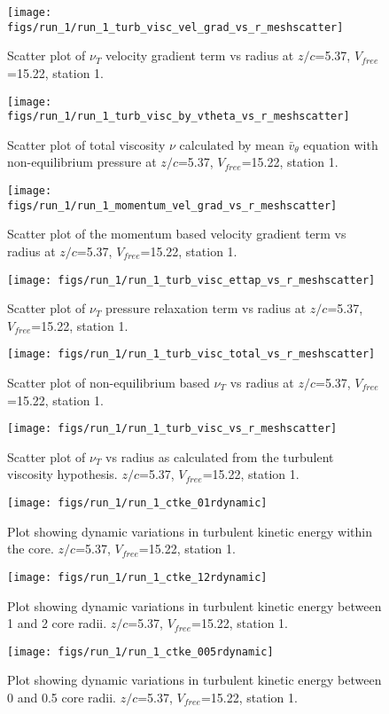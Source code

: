 \begin{figure}[H]
\centering
\texttt{[image: figs/run\_1/run\_1\_turb\_visc\_vel\_grad\_vs\_r\_meshscatter]}
\caption{Scatter plot of $\nu_T$ velocity gradient term vs radius at $z/c$=5.37, $V_{free}$=15.22, station 1.}
\end{figure}


\begin{figure}[H]
\centering
\texttt{[image: figs/run\_1/run\_1\_turb\_visc\_by\_vtheta\_vs\_r\_meshscatter]}
\caption{Scatter plot of total viscosity $\nu$ calculated by mean $\bar{v}_{\theta}$ equation with non-equilibrium pressure at $z/c$=5.37, $V_{free}$=15.22, station 1.}
\end{figure}


\begin{figure}[H]
\centering
\texttt{[image: figs/run\_1/run\_1\_momentum\_vel\_grad\_vs\_r\_meshscatter]}
\caption{Scatter plot of the momentum based velocity gradient term vs radius at $z/c$=5.37, $V_{free}$=15.22, station 1.}
\end{figure}


\begin{figure}[H]
\centering
\texttt{[image: figs/run\_1/run\_1\_turb\_visc\_ettap\_vs\_r\_meshscatter]}
\caption{Scatter plot of $\nu_T$ pressure relaxation term vs radius at $z/c$=5.37, $V_{free}$=15.22, station 1.}
\end{figure}


\begin{figure}[H]
\centering
\texttt{[image: figs/run\_1/run\_1\_turb\_visc\_total\_vs\_r\_meshscatter]}
\caption{Scatter plot of non-equilibrium based $\nu_T$ vs radius at $z/c$=5.37, $V_{free}$=15.22, station 1.}
\end{figure}


\begin{figure}[H]
\centering
\texttt{[image: figs/run\_1/run\_1\_turb\_visc\_vs\_r\_meshscatter]}
\caption{Scatter plot of $\nu_T$ vs radius as calculated from the turbulent viscosity hypothesis. $z/c$=5.37, $V_{free}$=15.22, station 1.}
\end{figure}


\begin{figure}[H]
\centering
\texttt{[image: figs/run\_1/run\_1\_ctke\_01rdynamic]}
\caption{Plot showing dynamic variations in turbulent kinetic energy within the core. $z/c$=5.37, $V_{free}$=15.22, station 1.}
\end{figure}


\begin{figure}[H]
\centering
\texttt{[image: figs/run\_1/run\_1\_ctke\_12rdynamic]}
\caption{Plot showing dynamic variations in turbulent kinetic energy between 1 and 2 core radii. $z/c$=5.37, $V_{free}$=15.22, station 1.}
\end{figure}


\begin{figure}[H]
\centering
\texttt{[image: figs/run\_1/run\_1\_ctke\_005rdynamic]}
\caption{Plot showing dynamic variations in turbulent kinetic energy between 0 and 0.5 core radii. $z/c$=5.37, $V_{free}$=15.22, station 1.}
\end{figure}


